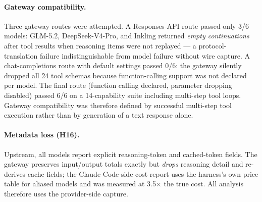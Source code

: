 \documentclass[11pt]{article}
\newcommand{\cc}{Claude Code}
\newcommand{\xd}{$\times$}
\begin{document}
\paragraph{Gateway compatibility.}
Three gateway routes were attempted. A Responses-API route passed only
3/6 models: GLM-5.2, DeepSeek-V4-Pro, and Inkling returned \emph{empty
continuations} after tool results when reasoning items were not replayed
--- a protocol-translation failure indistinguishable from model failure
without wire capture. A chat-completions route with default settings
passed 0/6: the gateway silently dropped all 24 tool schemas because
function-calling support was not declared per model. The final route
(function calling declared, parameter dropping disabled) passed 6/6 on a
14-capability suite including multi-step tool loops. Gateway compatibility
was therefore defined by successful multi-step tool execution rather than
by generation of a text response alone.

\paragraph{Metadata loss (H16).}
Upstream, all models report explicit reasoning-token and cached-token
fields. The gateway preserves input/output totals exactly but
\emph{drops} reasoning detail and re-derives cache fields; the \cc{}-side
cost report uses the harness's own price table for aliased models and was
measured at 3.5\xd{} the true cost. All analysis therefore uses the
provider-side capture.
\end{document}
